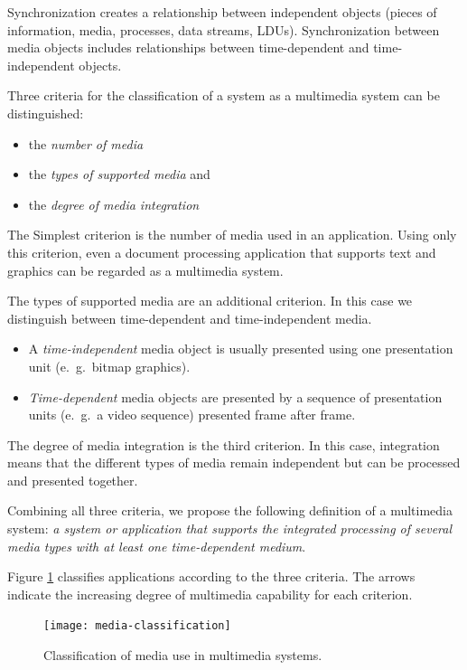 Synchronization creates a relationship between independent objects (pieces of information, media, processes, data streams, LDUs). Synchronization between media objects includes relationships between time-dependent and time-independent objects.

Three criteria for the classification of a system as a multimedia system can be distinguished: 

\begin{itemize}
	\item the \textit{number of media}
	\item the \textit{types of supported media} and 
	\item the \textit{degree of media integration}
\end{itemize}

The Simplest criterion is the number of media used in an application. Using only this criterion, even a document processing application that supports text and graphics can be regarded as a multimedia system. 

The types of supported media are an additional criterion. In this case we distinguish between time-dependent and time-independent media. 
\begin{itemize}
	\item A \textit{time-independent} media object is usually presented using one presentation unit (e.\ g.\ bitmap graphics).
	\item \textit{Time-dependent} media objects are presented by a sequence of presentation units (e.\ g.\ a video sequence) presented frame after frame.
\end{itemize}

The degree of media integration is the third criterion. In this case, integration means that the different types of media remain independent but can be processed and presented together.

Combining all three criteria, we propose the following definition of a multimedia system: \textit{a system or application that supports the integrated processing of several media types with at least one time-dependent medium}.

Figure \ref{fig:media-classification} classifies applications according to the three criteria. The arrows indicate the increasing degree of multimedia capability for each criterion.

\begin{figure}[ht]
	\centering
	\texttt{[image: media-classification]}
	\caption{Classification of media use in multimedia systems.}
	\label{fig:media-classification}
\end{figure}

